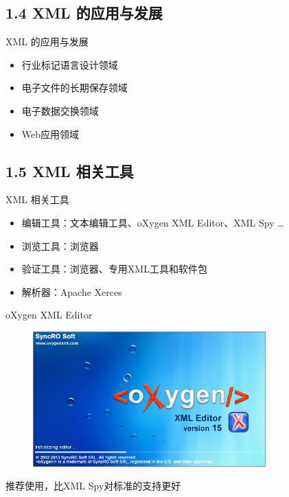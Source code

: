 \subsection{1.4 XML 的应用与发展}
\begin{frame}[fragile]{ XML 的应用与发展}
\begin{itemize} 
\item 行业标记语言设计领域
\item 电子文件的长期保存领域
\item 电子数据交换领域
\item Web应用领域
\end{itemize}
\end{frame}


\subsection{1.5 XML 相关工具}
\begin{frame}[fragile]{ XML 相关工具}
\begin{itemize} 
\item 编辑工具：文本编辑工具、oXygen XML Editor、XML Spy \dots
\item 浏览工具：浏览器
\item 验证工具：浏览器、专用XML工具和软件包
\item 解析器：Apache Xerces
\end{itemize}
\end{frame}


\begin{frame}[fragile]{ oXygen XML Editor}
\begin{figure}
	\includegraphics[width=0.8\textwidth]{figure/intro-oxygen.png}
\end{figure}
\begin{shaded}
\par 推荐使用，比XML Spy对标准的支持更好
\end{shaded}
\end{frame}


